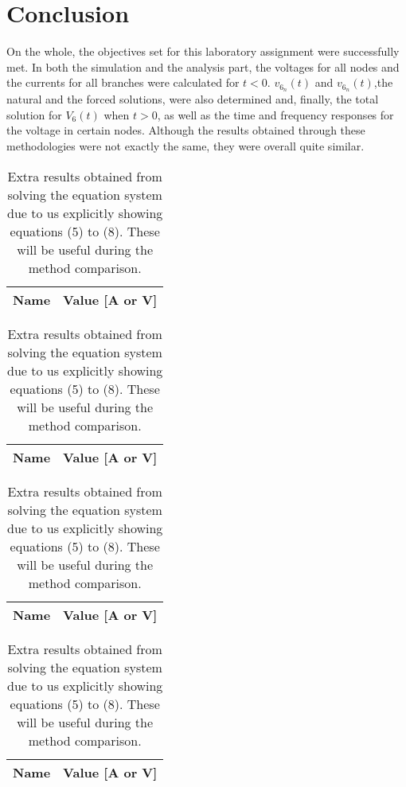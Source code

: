 \section{Conclusion}
\label{sec:conclusion}

On the whole, the objectives set for this laboratory assignment were successfully met.
In both the simulation and the analysis part, the voltages for all nodes and the currents for all branches were calculated for $t<0$. $v_{6_n}(t)$ and $v_{6_n}(t)$,the natural and the forced solutions, were also determined and, finally, the total solution for $V_6(t)$ when $t>0$, as well as the time and frequency responses for the voltage in certain nodes. Although the results obtained through these methodologies were not exactly the same, they were overall quite similar.


\begin{table}[hbt!]
  \centering
  \begin{tabular}{|c|c|}
    \hline    
    {\bf Name} & {\bf Value [A or V]} \\ \hline
    
  \end{tabular}
  \begin{tabular}{|c|c|}
    \hline    
    {\bf Name} & {\bf Value [A or V]} \\ \hline
    
  \end{tabular}
  \caption{Extra results obtained from solving the equation system due to us explicitly showing equations (5) to (8). These will be useful during the method comparison.}
  \label{tab:mesh}
\end{table}

\begin{table}[hbt!]
  \centering
  \begin{tabular}{|c|c|}
    \hline    
    {\bf Name} & {\bf Value [A or V]} \\ \hline
    
  \end{tabular}
  \begin{tabular}{|c|c|}
    \hline    
    {\bf Name} & {\bf Value [A or V]} \\ \hline
    
  \end{tabular}
  \caption{Extra results obtained from solving the equation system due to us explicitly showing equations (5) to (8). These will be useful during the method comparison.}
  \label{tab:mesh}
\end{table}

